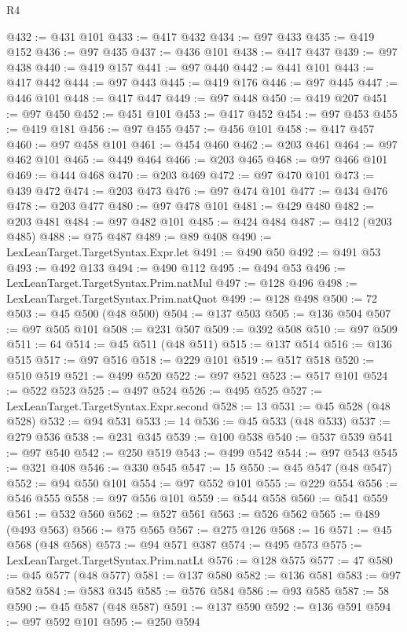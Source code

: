 \begin{lexlean}{R4}
\begin{coremodule}
@432 := @431 @101
@433 := @417 @432
@434 := @97 @433
@435 := @419 @152
@436 := @97 @435
@437 := @436 @101
@438 := @417 @437
@439 := @97 @438
@440 := @419 @157
@441 := @97 @440
@442 := @441 @101
@443 := @417 @442
@444 := @97 @443
@445 := @419 @176
@446 := @97 @445
@447 := @446 @101
@448 := @417 @447
@449 := @97 @448
@450 := @419 @207
@451 := @97 @450
@452 := @451 @101
@453 := @417 @452
@454 := @97 @453
@455 := @419 @181
@456 := @97 @455
@457 := @456 @101
@458 := @417 @457
@460 := @97 @458 @101
@461 := @454 @460
@462 := @203 @461
@464 := @97 @462 @101
@465 := @449 @464
@466 := @203 @465
@468 := @97 @466 @101
@469 := @444 @468
@470 := @203 @469
@472 := @97 @470 @101
@473 := @439 @472
@474 := @203 @473
@476 := @97 @474 @101
@477 := @434 @476
@478 := @203 @477
@480 := @97 @478 @101
@481 := @429 @480
@482 := @203 @481
@484 := @97 @482 @101
@485 := @424 @484
@487 := @412 (@203 @485)
@488 := @75 @487
@489 := @89 @408
@490 := LexLeanTarget.TargetSyntax.Expr.let
@491 := @490 @50
@492 := @491 @53
@493 := @492 @133
@494 := @490 @112
@495 := @494 @53
@496 := LexLeanTarget.TargetSyntax.Prim.natMul
@497 := @128 @496
@498 := LexLeanTarget.TargetSyntax.Prim.natQuot
@499 := @128 @498
@500 := 72
@503 := @45 @500 (@48 @500)
@504 := @137 @503
@505 := @136 @504
@507 := @97 @505 @101
@508 := @231 @507
@509 := @392 @508
@510 := @97 @509
@511 := 64
@514 := @45 @511 (@48 @511)
@515 := @137 @514
@516 := @136 @515
@517 := @97 @516
@518 := @229 @101
@519 := @517 @518
@520 := @510 @519
@521 := @499 @520
@522 := @97 @521
@523 := @517 @101
@524 := @522 @523
@525 := @497 @524
@526 := @495 @525
@527 := LexLeanTarget.TargetSyntax.Expr.second
@528 := 13
@531 := @45 @528 (@48 @528)
@532 := @94 @531
@533 := 14
@536 := @45 @533 (@48 @533)
@537 := @279 @536
@538 := @231 @345
@539 := @100 @538
@540 := @537 @539
@541 := @97 @540
@542 := @250 @519
@543 := @499 @542
@544 := @97 @543
@545 := @321 @408
@546 := @330 @545
@547 := 15
@550 := @45 @547 (@48 @547)
@552 := @94 @550 @101
@554 := @97 @552 @101
@555 := @229 @554
@556 := @546 @555
@558 := @97 @556 @101
@559 := @544 @558
@560 := @541 @559
@561 := @532 @560
@562 := @527 @561
@563 := @526 @562
@565 := @489 (@493 @563)
@566 := @75 @565
@567 := @275 @126
@568 := 16
@571 := @45 @568 (@48 @568)
@573 := @94 @571 @387
@574 := @495 @573
@575 := LexLeanTarget.TargetSyntax.Prim.natLt
@576 := @128 @575
@577 := 47
@580 := @45 @577 (@48 @577)
@581 := @137 @580
@582 := @136 @581
@583 := @97 @582
@584 := @583 @345
@585 := @576 @584
@586 := @93 @585
@587 := 58
@590 := @45 @587 (@48 @587)
@591 := @137 @590
@592 := @136 @591
@594 := @97 @592 @101
@595 := @250 @594

\end{coremodule}
\end{lexlean}
